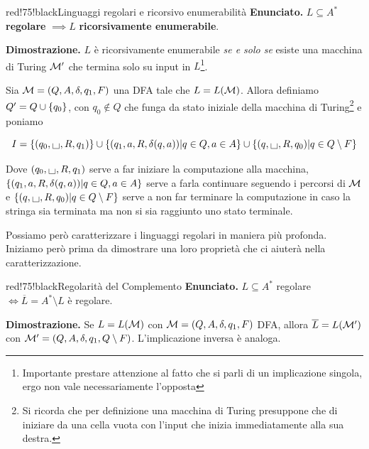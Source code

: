 \begin{halfframedbox}{red!75!black}{Linguaggi regolari e ricorsivo enumerabilità}
  \textbf{Enunciato. } \(L \subseteq A^*\) \textbf{regolare} \(\implies L\) \textbf{ricorsivamente enumerabile}.

  \begin{center}
    \textcolor{red!75!black}{\hdashrule[0.5ex]{18cm}{1pt}{3mm 3pt 1mm 2pt}}
  \end{center}

  \textbf{Dimostrazione. } \(L\) è ricorsivamente enumerabile \textit{se e solo se} esiste una macchina di Turing \(\mathcal{M}'\) che termina solo su input in \(L\)\footnote{Importante prestare attenzione al fatto che si parli di un implicazione singola, ergo non vale necessariamente l'opposta}.

  Sia \(\mathcal{M}=(Q,A,\delta,q_1,F)\) una DFA tale che \(L=L(\mathcal{M})\). Allora definiamo \(Q'=Q\cup\displaystyle{\left\{{q_0}\right\}}\), con \(q_0 \nin Q\) che funga da stato iniziale della macchina di Turing\footnote{Si ricorda che per definizione una macchina di Turing presuppone che di iniziare da una cella vuota con l'input che inizia immediatamente alla sua destra.} e poniamo

  \begin{equation}
    I=\cbrakets{(q_0, \text{\Large{\textbf{\textvisiblespace}}},R,q_1)} \cup \cbrakets{(q_1,a,R,\delta(q,a))\vert q\in Q, a \in A} \cup \cbrakets{(q,\text{\Large{\textbf{\textvisiblespace}}},R,q_0)\vert q \in Q\setminus F}
  \end{equation}

  Dove \((q_0, \text{\Large{\textbf{\textvisiblespace}}},R,q_1)\) serve a far iniziare la computazione alla macchina, \(\displaystyle{\left\{{(q_1,a,R,\delta(q,a))\vert q\in Q, a \in A}\right\}}\) serve a farla continuare seguendo i percorsi di \(\mathcal{M}\) e \(\cbrakets{(q,\text{\Large{\textbf{\textvisiblespace}}},R,q_0)\vert q \in Q\setminus F}\) serve a non far terminare la computazione in caso la stringa sia terminata ma non si sia raggiunto uno stato terminale.
\end{halfframedbox}

Possiamo però caratterizzare i linguaggi regolari in maniera più profonda. Iniziamo però prima da dimostrare una loro proprietà che ci aiuterà nella caratterizzazione.

\begin{halfframedbox}{red!75!black}{Regolarità del Complemento}\label{Regolarità del Complemento}
  \textbf{Enunciato. } \(L \subseteq A^*\) regolare \(\iff \overline{L}=A^*\setminus L\) è regolare.

  \begin{center}
    \textcolor{red!75!black}{\hdashrule[0.5ex]{18cm}{1pt}{3mm 3pt 1mm 2pt}}
  \end{center}

  \textbf{Dimostrazione. } Se \(L=L(\mathcal{M})\) con \(\mathcal{M}=(Q,A,\delta,q_1,F)\) DFA, allora \(\overline{L}=L(\mathcal{M}')\) con \(\mathcal{M}'=(Q,A,\delta,q_1,Q\setminus F)\). L'implicazione inversa è analoga.

\end{halfframedbox}

